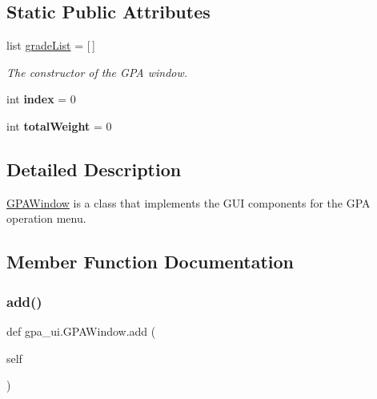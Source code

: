 \subsection*{Static Public Attributes}
\begin{DoxyCompactItemize}
\item 
list \hyperlink{classgpa__ui_1_1_g_p_a_window_a4a3352cb97e9c399dba7b5bf358e4938}{grade\+List} = \mbox{[}$\,$\mbox{]}
\begin{DoxyCompactList}\small\item\em The constructor of the G\+PA window. \end{DoxyCompactList}\item 
\mbox{\label{classgpa__ui_1_1_g_p_a_window_a65ee1ddf42db3f0daa69c9a2303bc6be}} 
int {\bfseries index} = 0
\item 
\mbox{\label{classgpa__ui_1_1_g_p_a_window_aa86bec5b54dc6fc81222d06272482575}} 
int {\bfseries total\+Weight} = 0
\end{DoxyCompactItemize}


\subsection{Detailed Description}
\hyperlink{classgpa__ui_1_1_g_p_a_window}{G\+P\+A\+Window} is a class that implements the G\+UI components for the G\+PA operation menu. 

\subsection{Member Function Documentation}
\mbox{\label{classgpa__ui_1_1_g_p_a_window_aca39733da3d44f4a5d694d7becea6832}} 
\subsubsection{\texorpdfstring{add()}{add()}}
{\footnotesize\ttfamily def gpa\+\_\+ui.\+G\+P\+A\+Window.\+add (\begin{DoxyParamCaption}\item[{}]{self }\end{DoxyParamCaption})}



